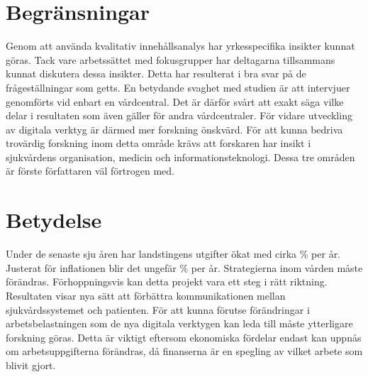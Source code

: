 \documentclass[12pt,a4paper,oneside]{article}
\let\oldcite\cite
\renewcommand*\cite[1]{\textsuperscript{\oldcite{#1}}}
\begin{document}
\section*{Begr{\"a}nsningar}
Genom att anv{\"a}nda kvalitativ inneh{\aa}llsanalys har yrkesspecifika insikter kunnat g{\"o}ras. Tack vare arbetss{\"a}ttet med fokusgrupper har deltagarna tillsammans kunnat diskutera dessa insikter. Detta har resulterat i bra svar p{\aa} de fr{\aa}gest{\"a}llningar som getts. En betydande svaghet med studien {\"a}r att intervjuer genomf{\"o}rts vid enbart en v{\aa}rdcentral. Det {\"a}r d{\"a}rf{\"o}r sv{\aa}rt att exakt s{\"a}ga vilke delar i resultaten som {\"a}ven g{\"a}ller f{\"o}r andra v{\aa}rdcentraler. F{\"o}r vidare utveckling av digitala verktyg {\"a}r d{\"a}rmed mer forskning {\"o}nskv{\"a}rd. F{\"o}r att kunna bedriva trov{\"a}rdig forskning inom detta omr{\aa}de kr{\"a}vs att forskaren har insikt i sjukv{\aa}rdens organisation, medicin och informationsteknologi. Dessa tre omr{\aa}den {\"a}r f{\"o}rste f{\"o}rfattaren v{\"a}l f{\"o}rtrogen med.

\section*{Betydelse}
Under de senaste sju {\aa}ren har landstingens utgifter {\"o}kat med cirka {}\% per {\aa}r. Justerat f{\"o}r inflationen blir det ungef{\"a}r {}\% per {\aa}r\cite{numbers3.1, numbers3.2}. Strategierna inom v{\aa}rden m{\aa}ste f{\"o}r{\"a}ndras. F{\"o}rhoppningsvis kan detta projekt vara ett steg i r{\"a}tt riktning. Resultaten visar nya s{\"a}tt att f{\"o}rb{\"a}ttra kommunikationen mellan sjukv{\aa}rdssystemet och patienten.
F{\"o}r att kunna f{\"o}rutse f{\"o}r{\"a}ndringar i arbetsbelastningen som de nya digitala verktygen kan leda till m{\aa}ste ytterligare forskning g{\"o}ras.  Detta {\"a}r viktigt eftersom ekonomiska f{\"o}rdelar endast kan uppn{\aa}s om arbetsuppgifterna f{\"o}r{\"a}ndras, d{\aa} finanserna {\"a}r en spegling av vilket arbete som blivit gjort.
\end{document}
